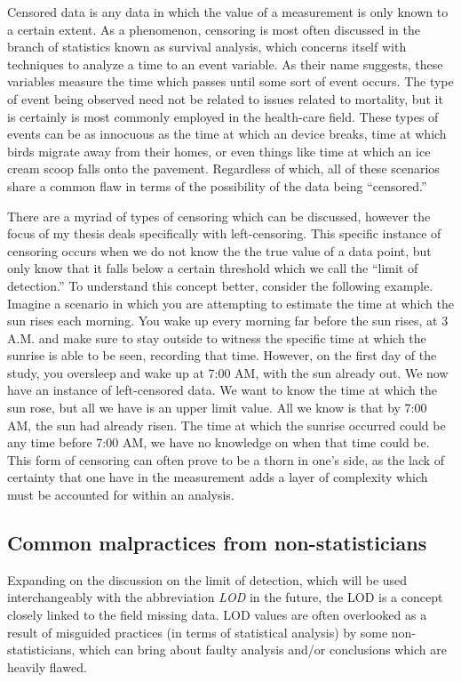 \documentclass[12pt, twoside]{amherstthesis}
\begin{document}
Censored data is any data in which the value of a measurement is only known to a certain extent. As a phenomenon, censoring is most often discussed in the branch of statistics known as survival analysis, which concerns itself with techniques to analyze a time to an event variable. As their name suggests, these variables measure the time which passes until some sort of event occurs. The type of event being observed need not be related to issues related to mortality, but it is certainly is most commonly employed in the health-care field. These types of events can be as innocuous as the time at which an device breaks, time at which birds migrate away from their homes, or even things like time at which an ice cream scoop falls onto the pavement. Regardless of which, all of these scenarios share a common flaw in terms of the possibility of the data being ``censored.''

There are a myriad of types of censoring which can be discussed, however the focus of my thesis deals specifically with left-censoring. This specific instance of censoring occurs when we do not know the the true value of a data point, but only know that it falls below a certain threshold which we call the ``limit of detection.'' To understand this concept better, consider the following example. Imagine a scenario in which you are attempting to estimate the time at which the sun rises each morning. You wake up every morning far before the sun rises, at 3 A.M. and make sure to stay outside to witness the specific time at which the sunrise is able to be seen, recording that time. However, on the first day of the study, you oversleep and wake up at 7:00 AM, with the sun already out. We now have an instance of left-censored data. We want to know the time at which the sun rose, but all we have is an upper limit value. All we know is that by 7:00 AM, the sun had already risen. The time at which the sunrise occurred could be any time before 7:00 AM, we have no knowledge on when that time could be. This form of censoring can often prove to be a thorn in one's side, as the lack of certainty that one have in the measurement adds a layer of complexity which must be accounted for within an analysis.

\hypertarget{malpractices}{%
\subsection{Common malpractices from non-statisticians}\label{malpractices}}

Expanding on the discussion on the limit of detection, which will be used interchangeably with the abbreviation \emph{LOD} in the future, the LOD is a concept closely linked to the field missing data. LOD values are often overlooked as a result of misguided practices (in terms of statistical analysis) by some non-statisticians, which can bring about faulty analysis and/or conclusions which are heavily flawed.
\end{document}
